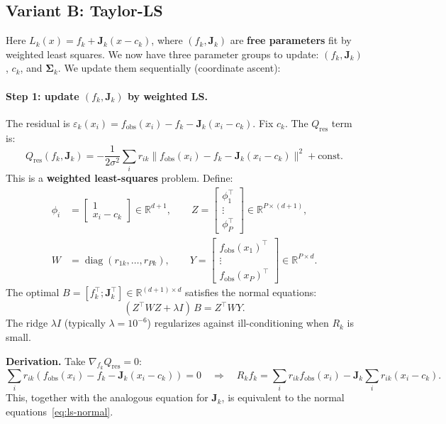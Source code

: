 \documentclass[11pt]{article}
\theoremstyle{definition}
\theoremstyle{plain}
\theoremstyle{remark}
\newcommand{\R}{\mathbb{R}}
\newcommand{\Sv}{\boldsymbol{\Sigma}}
\newcommand{\Jv}{\boldsymbol{J}}
\newcommand{\diag}{\operatorname{diag}}
\newenvironment{derivation}{\par\medskip\noindent\textbf{Derivation.} }{\par\medskip}
\begin{document}
\subsection{Variant B: Taylor-LS}

Here $L_k(x)=f_k+\Jv_k(x-c_k)$, where $(f_k,\Jv_k)$ are \textbf{free parameters} fit by weighted least squares. We now have three parameter groups to update: $(f_k,\Jv_k)$, $c_k$, and $\Sv_k$. We update them sequentially (coordinate ascent):

\paragraph{Step 1: update $(f_k,\Jv_k)$ by weighted LS.}

The residual is $\varepsilon_k(x_i)=f_{\mathrm{obs}}(x_i)-f_k-\Jv_k(x_i-c_k)$. Fix $c_k$. The $Q_{\text{res}}$ term is:
\begin{equation}
  Q_{\text{res}}(f_k,\Jv_k) = -\frac{1}{2\sigma^2}\sum_i r_{ik}\|f_{\mathrm{obs}}(x_i)-f_k-\Jv_k(x_i-c_k)\|^2 + \text{const}.
\end{equation}
This is a \textbf{weighted least-squares} problem. Define:
\begin{align}
  \phi_i &= \begin{bmatrix}1\\x_i-c_k\end{bmatrix}\in\R^{d+1}, \qquad Z = \begin{bmatrix}\phi_1^\top\\\vdots\\\phi_P^\top\end{bmatrix}\in\R^{P\times(d+1)}, \\
  W &= \diag(r_{1k},\dots,r_{Pk}), \qquad Y = \begin{bmatrix}f_{\mathrm{obs}}(x_1)^\top\\\vdots\\f_{\mathrm{obs}}(x_P)^\top\end{bmatrix}\in\R^{P\times d}.
\end{align}
The optimal $B=[f_k^\top;\Jv_k^\top]\in\R^{(d+1)\times d}$ satisfies the normal equations:
\begin{equation}
  (Z^\top W Z+\lambda I)\,B = Z^\top W Y.
  \label{eq:ls-normal}
\end{equation}
The ridge $\lambda I$ (typically $\lambda=10^{-6}$) regularizes against ill-conditioning when $R_k$ is small.

\begin{derivation}
Take $\nabla_{f_k}Q_{\text{res}}=0$:
\[
  \sum_i r_{ik}(f_{\mathrm{obs}}(x_i)-f_k-\Jv_k(x_i-c_k))=0 \quad\Longrightarrow\quad R_k f_k = \sum_i r_{ik}f_{\mathrm{obs}}(x_i)-\Jv_k\sum_i r_{ik}(x_i-c_k).
\]
This, together with the analogous equation for $\Jv_k$, is equivalent to the normal equations~\eqref{eq:ls-normal}.
\end{derivation}
\end{document}
